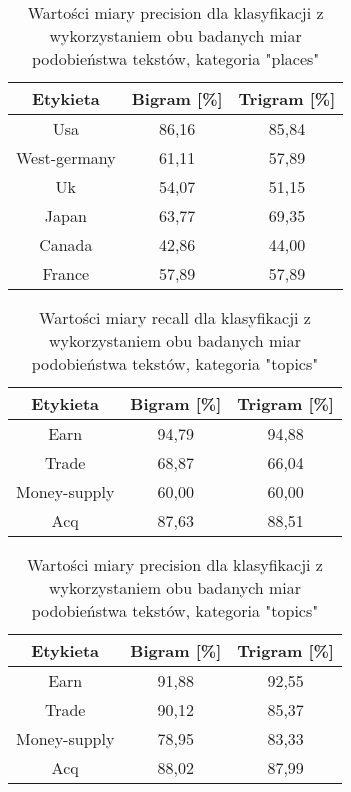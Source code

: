\documentclass{classrep}
\begin{document}
\begin{table}[H]
	\centering
	\begin{tabular}{c c c} 
		\hline
		\textbf{Etykieta} & \textbf{Bigram  [\%]} & \textbf{Trigram  [\%]} \\ [0.5ex] 
		\hline
		\hline 
Usa	&	86,16	&	85,84	\\
West-germany	&	61,11	&	57,89	\\
Uk	&	54,07	&	51,15	\\
Japan	&	63,77	&	69,35	\\
Canada	&	42,86	&	44,00	\\
France	&	57,89	&	57,89	\\
		\hline
	\end{tabular}
	\caption{Wartości miary precision dla klasyfikacji z wykorzystaniem obu badanych miar podobieństwa tekstów, kategoria "places"}
\end{table}

\begin{table}[H]
	\centering
	\begin{tabular}{c c c} 
		\hline
		\textbf{Etykieta} & \textbf{Bigram  [\%]} & \textbf{Trigram  [\%]} \\ [0.5ex] 
		\hline
		\hline 
Earn	&	94,79	&	94,88	\\
Trade	&	68,87	&	66,04	\\
Money-supply	&	60,00	&	60,00	\\
Acq	&	87,63	&	88,51	\\
		\hline
	\end{tabular}
	\caption{Wartości miary recall dla klasyfikacji z wykorzystaniem obu badanych miar podobieństwa tekstów, kategoria "topics"}
\end{table}

\begin{table}[H]
	\centering
	\begin{tabular}{c c c} 
		\hline
		\textbf{Etykieta} & \textbf{Bigram  [\%]} & \textbf{Trigram  [\%]} \\ [0.5ex] 
		\hline
		\hline 
Earn	&	91,88	&	92,55	\\
Trade	&	90,12	&	85,37	\\
Money-supply	&	78,95	&	83,33	\\
Acq	&	88,02	&	87,99	\\
		\hline
	\end{tabular}
	\caption{Wartości miary precision dla klasyfikacji z wykorzystaniem obu badanych miar podobieństwa tekstów, kategoria "topics"}
\end{table}
\end{document}
